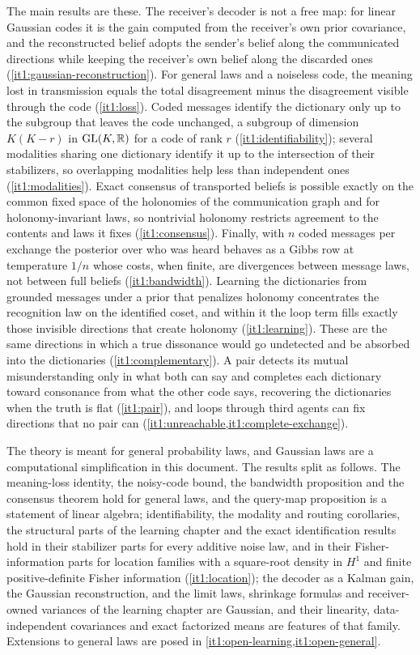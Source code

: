 \documentclass[11pt,letterpaper]{report}
\begin{document}
The main results are these. The receiver's decoder is not a free map: for linear Gaussian codes it is the gain computed from the receiver's own prior covariance, and the reconstructed belief adopts the sender's belief along the communicated directions while keeping the receiver's own belief along the discarded ones (\cref{it1:gaussian-reconstruction}). For general laws and a noiseless code, the meaning lost in transmission equals the total disagreement minus the disagreement visible through the code (\cref{it1:loss}). Coded messages identify the dictionary only up to the subgroup that leaves the code unchanged, a subgroup of dimension $K(K-r)$ in $\mathrm{GL}(K,\mathbb R)$ for a code of rank $r$ (\cref{it1:identifiability}); several modalities sharing one dictionary identify it up to the intersection of their stabilizers, so overlapping modalities help less than independent ones (\cref{it1:modalities}). Exact consensus of transported beliefs is possible exactly on the common fixed space of the holonomies of the communication graph and for holonomy-invariant laws, so nontrivial holonomy restricts agreement to the contents and laws it fixes (\cref{it1:consensus}). Finally, with $n$ coded messages per exchange the posterior over who was heard behaves as a Gibbs row at temperature $1/n$ whose costs, when finite, are divergences between message laws, not between full beliefs (\cref{it1:bandwidth}). Learning the dictionaries from grounded messages under a prior that penalizes holonomy concentrates the recognition law on the identified coset, and within it the loop term fills exactly those invisible directions that create holonomy (\cref{it1:learning}). These are the same directions in which a true dissonance would go undetected and be absorbed into the dictionaries (\cref{it1:complementary}). A pair detects its mutual misunderstanding only in what both can say and completes each dictionary toward consonance from what the other code says, recovering the dictionaries when the truth is flat (\cref{it1:pair}), and loops through third agents can fix directions that no pair can (\cref{it1:unreachable,it1:complete-exchange}).

The theory is meant for general probability laws, and Gaussian laws are a computational simplification in this document. The results split as follows. The meaning-loss identity, the noisy-code bound, the bandwidth proposition and the consensus theorem hold for general laws, and the query-map proposition is a statement of linear algebra; identifiability, the modality and routing corollaries, the structural parts of the learning chapter and the exact identification results hold in their stabilizer parts for every additive noise law, and in their Fisher-information parts for location families with a square-root density in $H^1$ and finite positive-definite Fisher information (\cref{it1:location}); the decoder as a Kalman gain, the Gaussian reconstruction, and the limit laws, shrinkage formulas and receiver-owned variances of the learning chapter are Gaussian, and their linearity, data-independent covariances and exact factorized means are features of that family. Extensions to general laws are posed in \cref{it1:open-learning,it1:open-general}.
\end{document}

